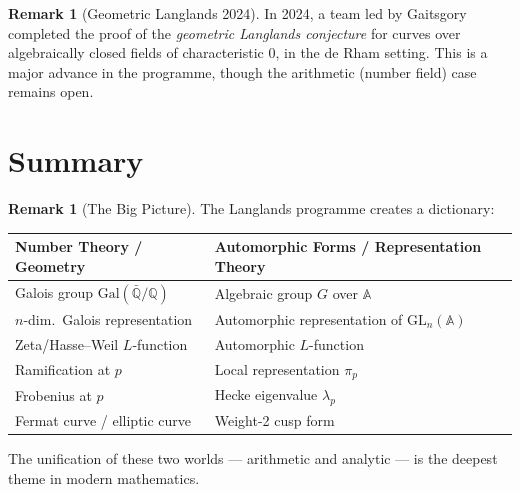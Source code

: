 \documentclass[12pt,a4paper]{amsart}
\theoremstyle{definition}
\newtheorem{remark}[theorem]{Remark}
\newcommand{\Q}{\mathbb{Q}}
\newcommand{\A}{\mathbb{A}}
\newcommand{\GL}{\mathrm{GL}}
\newcommand{\GQ}{\mathrm{Gal}(\bar{\Q}/\Q)}
\begin{document}
\begin{remark}[Geometric Langlands 2024]
In 2024, a team led by Gaitsgory completed the proof of the
\emph{geometric Langlands conjecture} for curves over algebraically closed
fields of characteristic 0, in the de Rham setting.  This is a major advance
in the programme, though the arithmetic (number field) case remains open.
\end{remark}

\section{Summary}

\begin{remark}[The Big Picture]
The Langlands programme creates a dictionary:
\begin{center}
\begin{tabular}{l|l}
\textbf{Number Theory / Geometry} & \textbf{Automorphic Forms / Representation Theory} \\
\hline
Galois group $\GQ$ & Algebraic group $G$ over $\A$ \\
$n$-dim.\ Galois representation & Automorphic representation of $\GL_n(\A)$ \\
Zeta/Hasse--Weil $L$-function & Automorphic $L$-function \\
Ramification at $p$ & Local representation $\pi_p$ \\
Frobenius at $p$ & Hecke eigenvalue $\lambda_p$ \\
Fermat curve / elliptic curve & Weight-2 cusp form \\
\end{tabular}
\end{center}
The unification of these two worlds — arithmetic and analytic — is the
deepest theme in modern mathematics.
\end{remark}
\end{document}
